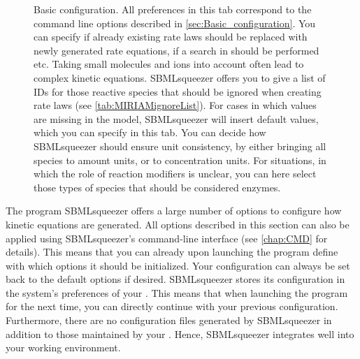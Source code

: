 \begin{figure}
\caption[Basic configuration]{Basic configuration.
All preferences %
in this tab correspond to the command line options described in
\vref{sec:Basic_configuration}. You can specify if already existing rate laws
should be replaced with newly generated rate equations, if a search in \SABIO
should be performed etc. %
Taking small molecules and ions into account often lead to complex kinetic equations.
SBMLsqueezer offers you to give a list of \KEGG \citep{Kanehisa2000a} \acp{ID} for those reactive
species that should be ignored when creating rate laws (see \vref{tab:MIRIAMignoreList}).
For cases in which values are missing in the
model, SBMLsqueezer will insert default values, which you can specify in this
tab. %
You can decide how SBMLsqueezer should ensure unit consistency,
by either bringing all species to amount units, or to concentration units.
For situations, in which the role of reaction modifiers is unclear, you
can here select those types of species that should be considered enzymes.}
\label{fig:Basic_Configuration}
\end{figure}
The program SBMLsqueezer offers a large number of options to configure how
kinetic equations are generated.
All options described in this section can also be applied using SBMLsqueezer's
command-line interface (see \vref{chap:CMD} for details).
This means that you can already upon launching the program define with which
options it should be initialized.
Your configuration can always be set back to the default options if desired.
SBMLsqueezer stores its configuration in the system's preferences of your \OS.
This means that when launching the program for the next time, you can directly
continue with your previous configuration.
Furthermore, there are no configuration files generated by SBMLsqueezer in
addition to those maintained by your \OS.
Hence, SBMLsqueezer integrates well into your working environment.

